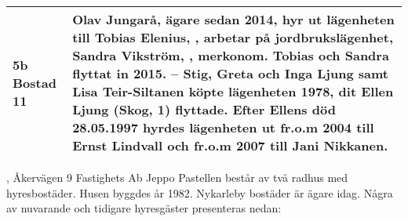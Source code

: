 \begin{center}
\begin{tabular}{l p{}}
    5b Bostad 11 & Olav Jungarå, ägare sedan 2014, hyr ut lägenheten till Tobias Elenius, \textborn 1993, arbetar på jordbrukslägenhet, Sandra Vikström, \textborn 1995, merkonom. Tobias och Sandra flyttat in 2015. -- Stig, Greta och Inga Ljung samt Lisa Teir-Siltanen köpte lägenheten 1978, dit Ellen Ljung (Skog, 1) flyttade. Efter Ellens död 28.05.1997 hyrdes lägenheten ut fr.o.m 2004 till Ernst Lindvall och fr.o.m 2007 till Jani Nikkanen. \\
    \hline
  \end{tabular}
\end{center}




, Åkervägen 9
Fastighets Ab Jeppo Pastellen består av två radhus med hyresbostäder. Husen byggdes år 1982. Nykarleby bostäder är ägare idag. Några av nuvarande och tidigare hyresgäster presenteras nedan:

